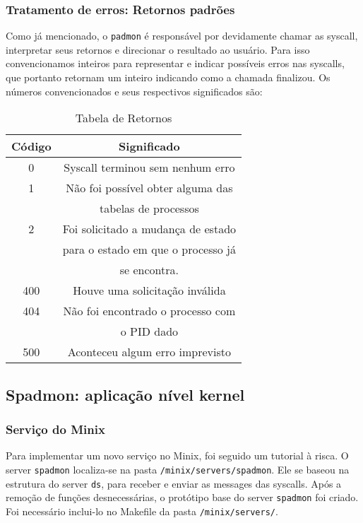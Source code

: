 \documentclass[12pt,journal,compsoc]{IEEEtran}
\begin{document}
\subsubsection{Tratamento de erros: Retornos padrões}

Como já mencionado, o \texttt{padmon} é responsável por devidamente chamar as syscall, interpretar seus retornos e direcionar o resultado ao usuário. Para isso convencionamos inteiros para representar e indicar possíveis erros nas syscalls, que portanto retornam um inteiro indicando como a chamada finalizou. Os números convencionados e seus respectivos significados são:

\begin{table}[H]
\renewcommand{\arraystretch}{1.3}
\caption{Tabela de Retornos}
\centering
\begin{tabular}{c|c}
    \hline
    Código  &  Significado\\
    \hline
    \hline
    0		&   Syscall terminou sem nenhum erro\\
    \hline
    1	    &   Não foi possível obter alguma das\\
            &	tabelas de processos\\
    \hline
    2		&	Foi solicitado a mudança de estado\\
    		&	para o estado em que o processo já\\
            &	se encontra.\\
    \hline
    400		&	Houve uma solicitação inválida\\
    \hline
    404		&	Não foi encontrado o processo com\\
    		&	o PID dado\\
    \hline
    500		&	Aconteceu algum erro imprevisto\\
    \hline
\end{tabular}
\end{table}

\subsection{Spadmon: aplicação nível kernel}

\subsubsection{Serviço do Minix}
Para implementar um novo serviço no Minix, foi seguido um tutorial\cite{service_tutorial:Heabuh} à risca. O server \texttt{spadmon} localiza-se na pasta \texttt{/minix/servers/spadmon}. Ele se baseou na estrutura do server \texttt{ds}, para receber e enviar as messages das syscalls. Após a remoção de funções desnecessárias, o protótipo base do server \texttt{spadmon} foi criado. Foi necessário inclui-lo no Makefile da pasta \texttt{/minix/servers/}.
\end{document}
